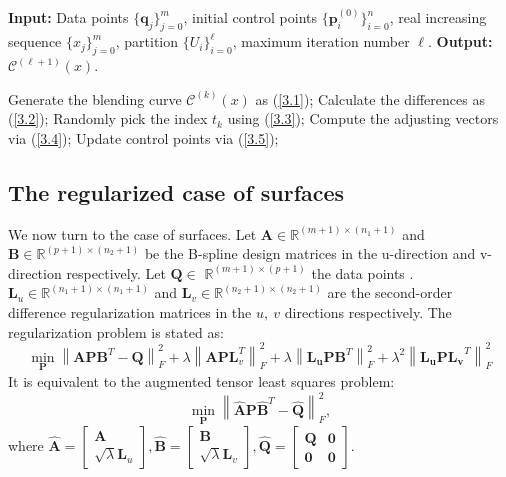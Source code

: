 \documentclass[11pt]{article}
\numberwithin{equation}{section}
\begin{document}
\begin{algorithm}
\caption{Regularized RPIA for curve fitting}
\label{algorithm1}
\begin{algorithmic}[1]
\STATE \textbf{Input:} Data points \(\{\mathbf{q}_j\}_{j=0}^m\), initial control points \(\{\mathbf{p}_i^{(0)}\}_{i=0}^n\), real increasing sequence \(\{x_j\}_{j=0}^m\), partition \(\{U_i\}_{i=0}^\ell\), maximum iteration number \(\ell\).
\STATE \textbf{Output:} \(\mathcal{C}^{(\ell+1)}(x)\).

      \STATE Generate the blending curve \(\mathcal{C}^{(k)}(x)\) as (\ref{3.1});
      \STATE Calculate the differences as (\ref{3.2});
      \STATE Randomly pick the index \(t_k\) using (\ref{3.3});
      \STATE Compute the adjusting vectors via (\ref{3.4});
      \STATE Update control points via (\ref{3.5});
\ENDFOR
\end{algorithmic}
\end{algorithm}

\subsection{The regularized case of surfaces}
We now turn to the case of surfaces. Let $\boldsymbol{A} \in \mathbb{R}^{(m+1) \times\left(n_1+1\right)}$ and $\boldsymbol{B} \in \mathbb{R}^{(p+1) \times\left(n_2+1\right)}$ be the B-spline design matrices in the u-direction and v-direction respectively. Let $\boldsymbol{Q} \in$ $\mathbb{R}^{(m+1) \times(p+1)}$ the data points . $\boldsymbol{L}_u \in \mathbb{R}^{\left(n_1+1\right) \times\left(n_1+1\right)}$ and $\boldsymbol{L}_v \in \mathbb{R}^{\left(n_2+1\right) \times\left(n_2+1\right)}$ are the second-order difference regularization matrices in the $u, ~ v$ directions respectively. The regularization problem is stated as:
$$
\min _{\boldsymbol{P}}\left\|\boldsymbol{A} \boldsymbol{P} \boldsymbol{B}^T-\boldsymbol{Q}\right\|_F^2+\lambda\left\|\boldsymbol{A} \boldsymbol{P}\boldsymbol{L}_v^T\right\|_F^2+\lambda\left\|\boldsymbol{L_u} \boldsymbol{P}\boldsymbol{B}^T\right\|_F^2+\lambda^2\left\|\boldsymbol{L_u} \boldsymbol{P}\boldsymbol{L_v}^T\right\|_F^2
$$
It is equivalent to the augmented tensor least squares problem:
$$
\min _{\boldsymbol{P}}\left\|\hat{\boldsymbol{A}} \boldsymbol{P} \hat{\boldsymbol{B}}^T-\hat{\boldsymbol{Q}}\right\|_F^2,
$$
where $\hat{\boldsymbol{A}}=\left[\begin{array}{c}\boldsymbol{A} \\ \sqrt{\lambda} \boldsymbol{L}_u\end{array}\right], \hat{\boldsymbol{B}}=\left[\begin{array}{c}\boldsymbol{B} \\ \sqrt{\lambda} \boldsymbol{L}_v\end{array}\right], \hat{\boldsymbol{Q}}=\left[\begin{array}{cc}\boldsymbol{Q} & \mathbf{0} \\ \mathbf{0} & \mathbf{0}\end{array}\right]$.
\end{document}
